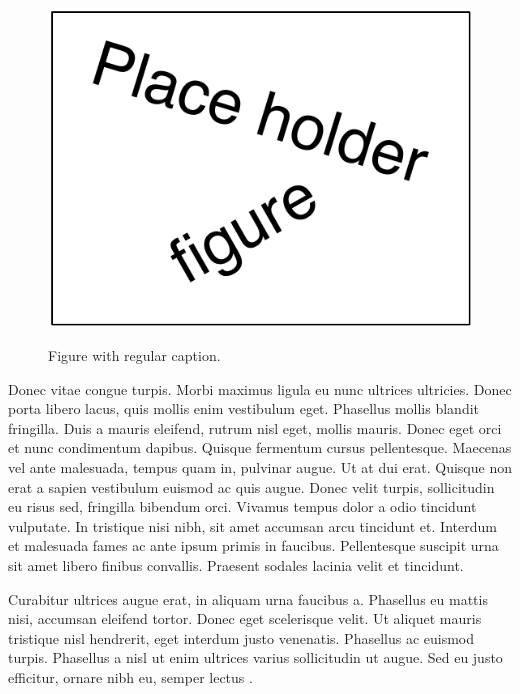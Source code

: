 \begin{figure}
	\ffigbox
	{\caption{Figure with regular caption.}\label{fig:figure_2}}
	{\includegraphics[width=\linewidth]{figures/results/place_holder}}
\end{figure}

Donec vitae congue turpis. Morbi maximus ligula eu nunc ultrices ultricies. Donec porta libero lacus, quis mollis enim vestibulum eget. Phasellus mollis blandit fringilla. Duis a mauris eleifend, rutrum nisl eget, mollis mauris. Donec eget orci et nunc condimentum dapibus. Quisque fermentum cursus pellentesque. Maecenas vel ante malesuada, tempus quam in, pulvinar augue. Ut at dui erat. Quisque non erat a sapien vestibulum euismod ac quis augue. Donec velit turpis, sollicitudin eu risus sed, fringilla bibendum orci. Vivamus tempus dolor a odio tincidunt vulputate. In tristique nisi nibh, sit amet accumsan arcu tincidunt et. Interdum et malesuada fames ac ante ipsum primis in faucibus. Pellentesque suscipit urna sit amet libero finibus convallis. Praesent sodales lacinia velit et tincidunt.

Curabitur ultrices augue erat, in aliquam urna faucibus a. Phasellus eu mattis nisi, accumsan eleifend tortor. Donec eget scelerisque velit. Ut aliquet mauris tristique nisl hendrerit, eget interdum justo venenatis. Phasellus ac euismod turpis. Phasellus a nisl ut enim ultrices varius sollicitudin ut augue. Sed eu justo efficitur, ornare nibh eu, semper lectus \cite{Geelhood:1998vs}.